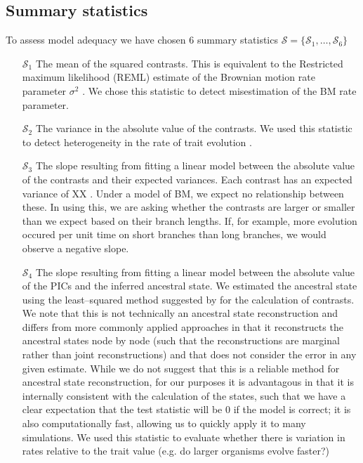 \documentclass[12pt]{article}
\begin{document}
\subsection*{Summary statistics}

To assess model adequacy we have chosen 6 summary statistics $\mathcal{S} = \lbrace \mathcal{S}_1, \ldots, \mathcal{S}_6 \rbrace$

\begin{enumerate}
\item[$\mathcal{S}_1$] The mean of the squared contrasts. This is equivalent to the Restricted maximum likelihood (REML) estimate of the Brownian motion rate parameter $\sigma^2$ \citep{Garland1992, Rohlf2001}. We chose this statistic to detect misestimation of the BM rate parameter.

\item[$\mathcal{S}_2$] The variance in the absolute value of the contrasts. We used this statistic to detect heterogeneity in the rate of trait evolution \citep[\textit{sensu}][]{Omeara2006, Eastman2011}.

\item[$\mathcal{S}_3$] The slope resulting from fitting a linear model between the absolute value of the contrasts and their expected variances. Each contrast has an expected variance of XX \citep{Felsenstein1985}. Under a model of BM, we expect no relationship between these. In using this, we are asking whether the contrasts are larger or smaller than we expect based on their branch lengths. If, for example, more evolution occured per unit time on short branches than long branches, we would observe a negative slope.

\item[$\mathcal{S}_4$] The slope resulting from fitting a linear model between the absolute value of the PICs and the inferred ancestral state. We estimated the ancestral state using the least--squared method suggested by \citep{Felsenstein1985} for the calculation of contrasts. We note that this is not technically an ancestral state reconstruction and differs from more commonly applied approaches \citep[such as the  maximum likelihood estimator][]{Schluter1997} in that it reconstructs the ancestral states node by node (such that the reconstructions are marginal rather than joint reconstructions) and that does not consider the error in any given estimate. While we do not suggest that this is a reliable method for ancestral state reconstruction, for our purposes it is advantagous in that it is internally consistent with the calculation of the states, such that we have a clear expectation that the test statistic will be 0 if the model is correct; it is also computationally fast, allowing us to quickly apply it to many simulations. We used this statistic to evaluate whether there is variation in rates relative to the trait value (e.g. do larger organisms evolve faster?)


\end{enumerate}
\end{document}

